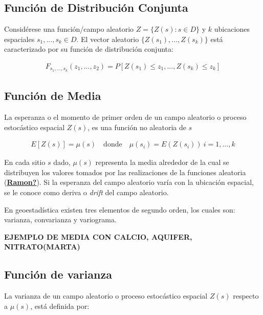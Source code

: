 \documentclass[
]{book}
\begin{document}
\hypertarget{funciuxf3n-de-distribuciuxf3n-conjunta}{%
\subsection{Función de Distribución Conjunta}\label{funciuxf3n-de-distribuciuxf3n-conjunta}}

Considérese una función/campo aleatorio \(Z=\{Z(s):s\in D\}\) y \(k\) ubicaciones espaciales \(s_1,...,s_k \in D\). El vector aleatorio \(\{Z(s_1),...,Z(s_k)\}\) está caracterizado por su función de distribución conjunta:

\begin{align}
F_{s_1,...,s_k}(z_1,...,z_2)=P[Z(s_1)\leq z_1,...,Z(s_k)\leq z_k]
\end{align}

\hypertarget{funciuxf3n-de-media}{%
\subsection{Función de Media}\label{funciuxf3n-de-media}}

La esperanza o el momento de primer orden de un campo aleatorio o proceso estocástico espacial \(Z(s)\), es una función no aleatoria de \(s\)

\begin{align}
E[Z(s)]=\mu(s)\quad\text{donde}\quad \mu(s_i)=E(Z(s_i))\ i=1,...,k    
\end{align}

En cada sitio \(s\) dado, \(\mu(s)\) representa la media alrededor de la cual se distribuyen los valores tomados por las realizaciones de la funciones aleatoria (\protect\hyperlink{ref-Ramon}{\textbf{Ramon?}}). Si la esperanza del campo aleatorio varía con la ubicación espacial, se le conoce como deriva o \emph{drift} del campo aleatorio.

En geoestadística existen tres elementos de segundo orden, los cuales son: varianza, convarianza y variograma.

\textbf{EJEMPLO DE MEDIA CON CALCIO, AQUIFER, NITRATO(MARTA)}

\hypertarget{funciuxf3n-de-varianza}{%
\subsection{Función de varianza}\label{funciuxf3n-de-varianza}}

La varianza de un campo aleatorio o proceso estocástico espacial \(Z(s)\) respecto a \(\mu(s)\), está definida por:
\end{document}
